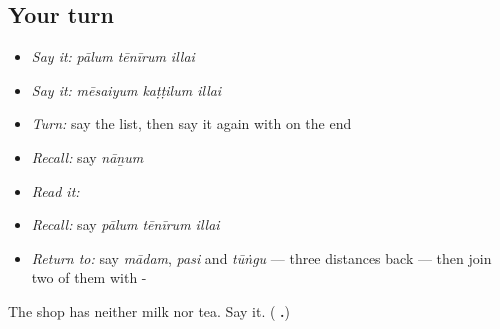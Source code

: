 \subsection*{Your turn}
\begin{itemize}
\raggedright
  \item \emph{Say it:} \emph{pālum tēnīrum illai}
  \item \emph{Say it:} \emph{mēsaiyum kaṭṭilum illai}
  \item \emph{Turn:} say the list, then say it again with  on the end
  \item \emph{Recall:} say \emph{nāṉum}
  \item \emph{Read it:} \textbf{}
  \item \emph{Recall:} say \emph{pālum tēnīrum illai}
  \item \emph{Return to:} say \emph{mādam}, \emph{pasi} and \emph{tūṅgu} — three distances back — then join two of them with -
\end{itemize}

\begin{tcolorbox}[breakable,colback=teal!4,colframe=teal!35!black,title={Before you move on}]
The shop has neither milk nor tea. Say it. (\textbf{  .})
\end{tcolorbox}
